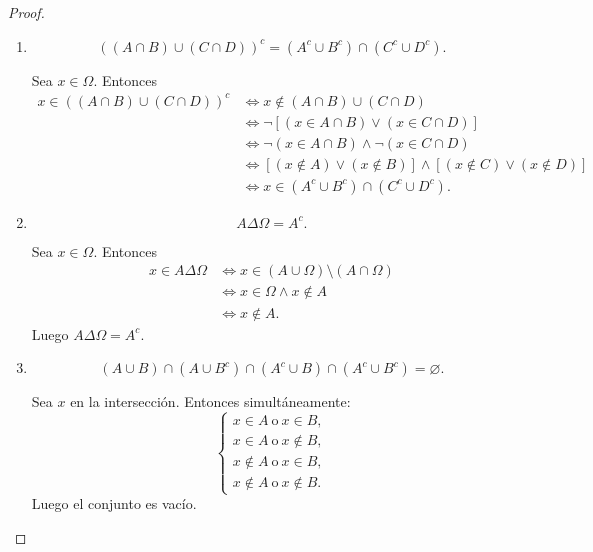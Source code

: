 \documentclass[12pt,a4paper]{article}
\begin{document}
    \begin{proof}
        \begin{enumerate}[label=(\alph*)]

            \item 
            \[
                ((A \cap B) \cup (C \cap D))^c
                = (A^c \cup B^c) \cap (C^c \cup D^c).
            \]
    
            Sea $x\in\Omega$. Entonces
            \begin{align*}
                x\in((A\cap B)\cup(C\cap D))^c
                &\iff x\notin (A\cap B)\cup(C\cap D) \\
                &\iff \neg[(x\in A\cap B)\lor(x\in C\cap D)] \\
                &\iff \neg(x\in A\cap B)\land \neg(x\in C\cap D) \\
                &\iff [(x\notin A)\lor(x\notin B)]
                \land[(x\notin C)\lor(x\notin D)] \\
                &\iff x\in (A^c\cup B^c)\cap(C^c\cup D^c).
            \end{align*}
    
            \item 
            \[
                A\Delta \Omega = A^c.
            \]
    
            Sea $x\in\Omega$. Entonces
            \begin{align*}
                x\in A\Delta\Omega
                &\iff x\in (A\cup\Omega)\setminus(A\cap\Omega) \\
                &\iff x\in \Omega \land x\notin A \\
                &\iff x\notin A.
            \end{align*}
            Luego $A\Delta\Omega=A^c$.
    
            \item
            \[
                (A \cup B) \cap (A \cup B^c)
                \cap (A^c \cup B) \cap (A^c \cup B^c)
                = \varnothing.
            \]
    
            Sea $x$ en la intersección. Entonces simultáneamente:
            \[
            \begin{cases}
                x\in A \ \text{o}\ x\in B,\\
                x\in A \ \text{o}\ x\notin B,\\
                x\notin A \ \text{o}\ x\in B,\\
                x\notin A \ \text{o}\ x\notin B.
            \end{cases}
            \]
            Luego el conjunto es vacío.
    

\end{enumerate}
\end{proof}
\end{document}
